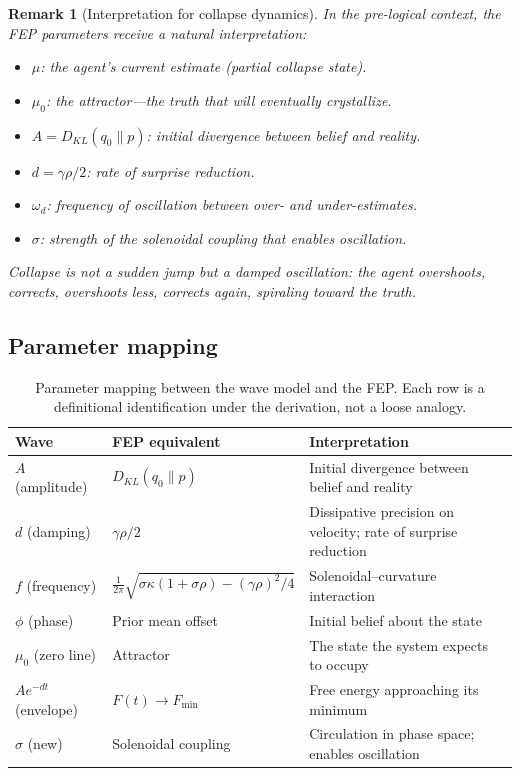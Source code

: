 \documentclass[11pt,a4paper]{article}
\newtheorem{remark}[theorem]{Remark}
\begin{document}
\begin{remark}[Interpretation for collapse dynamics]
\label{rem:collapse-dynamics}
In the pre-logical context, the FEP parameters receive a natural
interpretation:
\begin{itemize}[nosep]
\item $\mu$: the agent's current estimate (partial collapse state).
\item $\mu_0$: the attractor---the truth that will eventually crystallize.
\item $A = D_{KL}(q_0 \| p)$: initial divergence between belief and reality.
\item $d = \gamma\rho/2$: rate of surprise reduction.
\item $\omega_d$: frequency of oscillation between over- and under-estimates.
\item $\sigma$: strength of the solenoidal coupling that enables oscillation.
\end{itemize}
Collapse is not a sudden jump but a \emph{damped oscillation}:
the agent overshoots, corrects, overshoots less, corrects again, spiraling
toward the truth.
\end{remark}

\subsection{Parameter mapping}

\begin{table}[H]
\centering
\caption{Parameter mapping between the wave model and the FEP.
Each row is a definitional identification under the derivation, not a
loose analogy.}
\label{tab:params}
\begin{tabularx}{\textwidth}{l Y Y}
\toprule
\textbf{Wave} & \textbf{FEP equivalent} & \textbf{Interpretation} \\
\midrule
$A$ (amplitude) & $D_{KL}(q_0 \| p)$ & Initial divergence between
  belief and reality \\
$d$ (damping) & $\gamma\rho/2$ & Dissipative precision on velocity;
  rate of surprise reduction \\
$f$ (frequency) & $\frac{1}{2\pi}\sqrt{\sigma\kappa(1{+}\sigma\rho)
  - (\gamma\rho)^2/4}$ & Solenoidal--curvature interaction \\
$\phi$ (phase) & Prior mean offset & Initial belief about the state \\
$\mu_0$ (zero line) & Attractor & The state the system expects to
  occupy \\
$Ae^{-dt}$ (envelope) & $F(t) \to F_{\min}$ & Free energy approaching
  its minimum \\
$\sigma$ (new) & Solenoidal coupling & Circulation in phase space;
  enables oscillation \\
\bottomrule
\end{tabularx}
\end{table}
\end{document}
